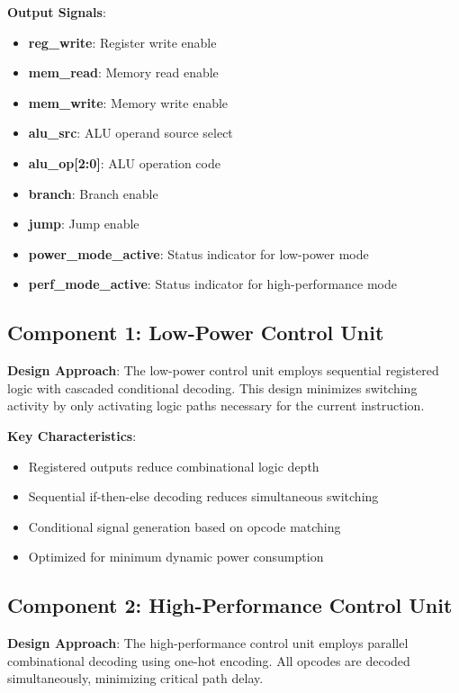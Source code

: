 \documentclass[15pt,a4paper]{report}
\begin{document}
\textbf{Output Signals}:
\begin{itemize}
    \item \textbf{reg\_write}: Register write enable
    \item \textbf{mem\_read}: Memory read enable
    \item \textbf{mem\_write}: Memory write enable
    \item \textbf{alu\_src}: ALU operand source select
    \item \textbf{alu\_op[2:0]}: ALU operation code
    \item \textbf{branch}: Branch enable
    \item \textbf{jump}: Jump enable
    \item \textbf{power\_mode\_active}: Status indicator for low-power mode
    \item \textbf{perf\_mode\_active}: Status indicator for high-performance mode
\end{itemize}

\subsection{Component 1: Low-Power Control Unit}

\textbf{Design Approach}: The low-power control unit employs sequential registered logic with cascaded conditional decoding. This design minimizes switching activity by only activating logic paths necessary for the current instruction.

\textbf{Key Characteristics}:
\begin{itemize}
    \item Registered outputs reduce combinational logic depth
    \item Sequential if-then-else decoding reduces simultaneous switching
    \item Conditional signal generation based on opcode matching
    \item Optimized for minimum dynamic power consumption
\end{itemize}

\subsection{Component 2: High-Performance Control Unit}

\textbf{Design Approach}: The high-performance control unit employs parallel combinational decoding using one-hot encoding. All opcodes are decoded simultaneously, minimizing critical path delay.
\end{document}
